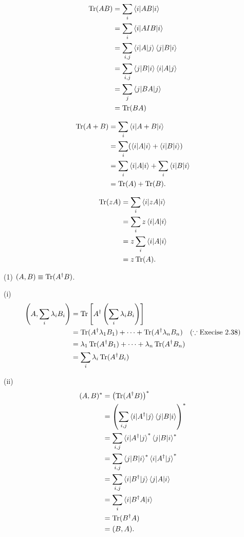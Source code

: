 \begin{align*}
	\operatorname{Tr} (AB) &= \sum_i \braket{i | AB | i}\\
		&=\sum_i \braket{i | A I B | i}\\
		&= \sum_{i,j} \braket{i | A | j}\braket{j | B | i}\\
		&= \sum_{i,j} \braket{j | B | i} \braket{i | A | j}\\
		&= \sum_j \braket{j | BA | j}\\
		&= \operatorname{Tr} (BA)
\end{align*}



\begin{align*}
	\operatorname{Tr} (A + B) &= \sum_i \braket{i | A+B | i}\\
		&= \sum_i (\braket{i|A|i}  + \braket{i | B | i}  )\\
		&= \sum_i \braket{i|A|i} + \sum_i \braket{i|B|i}\\
		&= \operatorname{Tr} (A) + \operatorname{Tr} (B).
\end{align*}

\begin{align*}
	\operatorname{Tr} (z A) &=  \sum_i \braket{i | z A | i}\\
		&= \sum_i z \braket{i | A | i}\\
		&= z \sum_i \braket{i | A | i}\\
		&= z \operatorname{Tr} (A).
\end{align*}





(1) $(A, B) \equiv \operatorname{Tr} (A^\dagger B)$.

\vspace{5mm}
(i)
\begin{align*}
	\left(A, \sum_i \lambda_i B_i \right) &= \operatorname{Tr} \left[ A^\dagger \left(\sum_i \lambda_i B_i  \right) \right]\\
		&= \operatorname{Tr} (A^\dagger \lambda_1 B_1) + \cdots +  \operatorname{Tr} (A^\dagger \lambda_n B_n) ~~~ (\because \text{Execise 2.38}) \\
		&= \lambda_1 \operatorname{Tr} (A^\dagger B_1)  + \cdots  + \lambda_n \operatorname{Tr} (A^\dagger B_n) \\
		&= \sum_i \lambda_i \operatorname{Tr} (A^\dagger B_i)
\end{align*}


(ii)
\begin{align*}
	(A, B)^* &= \left( \operatorname{Tr} (A^\dagger B) \right)^*\\
		&= \left(\sum_{i,j} \braket{ i | A^\dagger | j} \braket{j | B | i}  \right)^*\\
		&= \sum_{i,j} \braket{ i | A^\dagger | j}^* \braket{j | B | i}^*\\
		&= \sum_{i,j}  \braket{j | B | i}^* \braket{ i | A^\dagger | j}^*\\
		&=  \sum_{i,j}  \braket{i | B^\dagger | j} \braket{ j | A | i}\\
		&= \sum_i \braket{i | B^\dagger A | i} \\
		&= \operatorname{Tr} (B^\dagger A)\\
		&= (B, A).
\end{align*}


